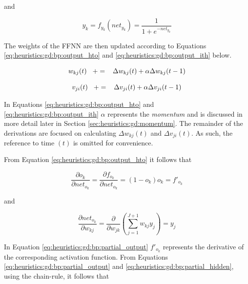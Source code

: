 and

\begin{equation}
    \label{eq:heuristics:gd:bp:output_2}
    y_{k} = f_{y_{k}}(net_{y_{k}}) = \frac{1}{1 + e^{-net_{y_{k}}}}
\end{equation}

The weights of the \ac{FFNN} are then updated according to Equations \ref{eq:heuristics:gd:bp:output_hto} and \ref{eq:heuristics:gd:bp:output_ith} below.

\begin{equation}
    \label{eq:heuristics:gd:bp:output_hto}
    w_{kj}(t) \hspace{3mm} += \hspace{3mm} \Delta w_{kj}(t) + \alpha \Delta w_{kj}(t - 1)
\end{equation}

\begin{equation}
    \label{eq:heuristics:gd:bp:output_ith}
    v_{ji}(t) \hspace{3mm} += \hspace{3mm} \Delta v_{ji}(t) + \alpha \Delta v_{ji}(t - 1)
\end{equation}

In Equations \ref{eq:heuristics:gd:bp:output_hto} and \ref{eq:heuristics:gd:bp:output_ith} $\alpha$ represents the \textit{momentum} and is discussed in more detail later in Section \ref{sec:heuristics:gd:momentum}. The remainder of the derivations are focused on calculating $\Delta w_{kj}(t)$ and $\Delta v_{ji}(t)$. As such, the reference to time $(t)$ is omitted for convenience.

From Equation \ref{eq:heuristics:gd:bp:output_hto} it follows that

\begin{equation}
    \label{eq:heuristics:gd:bp:partial_output}
    \frac{\partial o_{k}}{\partial net_{o_{k}}} = \frac{\partial f_{o_{k}}}{\partial net_{o_{k}}} = (1 - o_{k})o_{k} = f'_{o_{k}} 
\end{equation}

and

\begin{equation}
    \label{eq:heuristics:gd:bp:partial_hidden}
    \frac{\partial net_{o_{k}}}{\partial w_{kj}} = \frac{\partial}{\partial w_{jk}}\left( \sum^{J+1}_{j=1}w_{kj}y_{j}\right) = y_{j}
\end{equation}

In Equation \ref{eq:heuristics:gd:bp:partial_output} $f'_{o_{k}}$ represents the derivative of the corresponding activation function. From Equations \ref{eq:heuristics:gd:bp:partial_output} and \ref{eq:heuristics:gd:bp:partial_hidden}, using the chain-rule, it follows that


